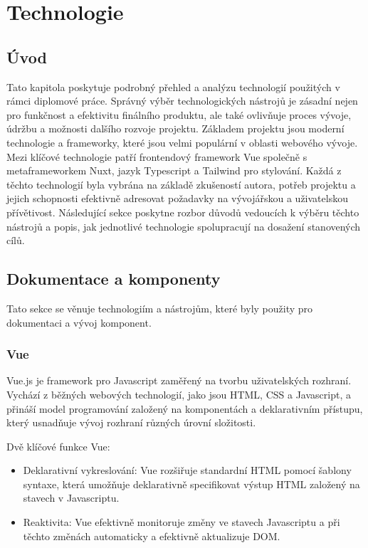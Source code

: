 
\chapter{Technologie}
\label{chap:technologie}

\section{Úvod}
Tato kapitola poskytuje podrobný přehled a analýzu technologií použitých v rámci diplomové práce. Správný výběr technologických nástrojů je zásadní nejen pro funkčnost a efektivitu finálního produktu, ale také ovlivňuje proces vývoje, údržbu a možnosti dalšího rozvoje projektu. Základem projektu jsou moderní technologie a frameworky, které jsou velmi populární v oblasti webového vývoje. Mezi klíčové technologie patří frontendový framework Vue společně s metaframeworkem Nuxt, jazyk Typescript a Tailwind pro stylování. Každá z těchto technologií byla vybrána na základě zkušeností autora, potřeb projektu a jejich schopnosti efektivně adresovat požadavky na vývojářskou a uživatelskou přívětivost. Následující sekce poskytne rozbor důvodů vedoucích k výběru těchto nástrojů a popis, jak jednotlivé technologie spolupracují na dosažení stanovených cílů.

\section{Dokumentace a komponenty}
Tato sekce se věnuje technologiím a nástrojům, které byly použity pro dokumentaci a vývoj komponent.

\subsection{Vue}
Vue.js je framework pro Javascript zaměřený na tvorbu uživatelských rozhraní. Vychází z běžných webových technologií, jako jsou HTML, CSS a Javascript, a přináší model programování založený na komponentách a deklarativním přístupu, který usnadňuje vývoj rozhraní různých úrovní složitosti.

Dvě klíčové funkce Vue:

\begin{itemize}
  \item Deklarativní vykreslování: Vue rozšiřuje standardní HTML pomocí šablony syntaxe, která umožňuje deklarativně specifikovat výstup HTML založený na stavech v Javascriptu.
  \item Reaktivita: Vue efektivně monitoruje změny ve stavech Javascriptu a při těchto změnách automaticky a efektivně aktualizuje DOM. \cite{WhatIsVue}
\end{itemize}

